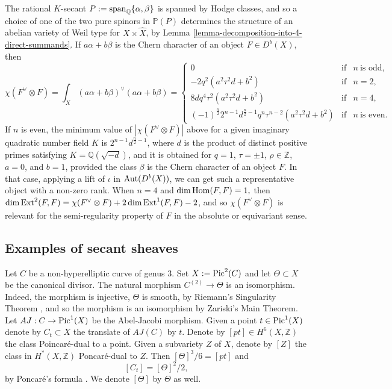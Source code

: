 \documentclass[12pt]{amsart}
\numberwithin{equation}{subsection}
\theoremstyle{plain}
\theoremstyle{definition}
\newcommand{\QQ}{{\mathbb Q}}
\newcommand{\ZZ}{{\mathbb Z}}
\newcommand{\PP}{{\mathbb P}}
\newcommand{\Pic}{{\rm Pic}}
\newcommand{\Ext}{{\rm Ext}}
\newcommand{\Hom}{{\rm Hom}}
\newcommand{\Aut}{{\rm Aut}}
\renewcommand{\span}{{\rm span}}
\begin{document}
The rational $K$-secant $P:=\span_\QQ\{\alpha,\beta\}$ is spanned by Hodge classes, and so a choice of one of the two pure spinors in $\PP(P)$ determines 
the structure of an abelian variety of Weil type for $X\times\hat{X}$, by Lemma \ref{lemma-decomposition-into-4-direct-summands}. If $a\alpha+b\beta$ is the Chern character of an object $F\in D^b(X)$, then
\[
\chi(F^\vee\otimes F)=\int_X(a\alpha+b\beta)^\vee(a\alpha+b\beta)=\left\{
\begin{array}{ccl}
0 & \mbox{if} & n \ \mbox{is odd},
\\
 -2q^2(a^2\tau^2d+b^2) & \mbox{if} & n=2,
 \\
 8dq^4\tau^2(a^2\tau^2d+b^2) & \mbox{if} & n=4,
 \\
(-1)^{\frac{n}{2}}2^{n-1}d^{\frac{n}{2}-1}q^n\tau^{n-2}(a^2\tau^2d+b^2)
& \mbox{if} & n \ \mbox{is even.}
\end{array}
\right.
\]
If $n$ is even, the minimum value of $|\chi(F^\vee\otimes F)|$ above for a given imaginary quadratic number field $K$ 
is $2^{n-1}d^{\frac{n}{2}-1}$, where $d$ is the product of distinct positive primes satisfying $K=\QQ(\sqrt{-d})$, and it is obtained for $q=1$, $\tau=\pm 1$, $\rho\in \ZZ$, $a=0$, and $b=1$, provided the class $\beta$ is the Chern character of an object $F$. In that case, applying a lift of $\iota$ in $\Aut(D^b(X))$, we can get such a representative object with a non-zero rank. When $n=4$ and $\dim\Hom(F,F)=1,$
then $\dim\Ext^2(F,F)=\chi(F^\vee\otimes F)+2\dim\Ext^1(F,F)-2$, and so $\chi(F^\vee\otimes F)$ is relevant for the semi-regularity property of $F$ in the absolute or equivariant sense. 
% 
\subsection{Examples of secant sheaves}
\label{sec-examples-of-secant-sheaves}

Let $C$ be a non-hyperelliptic curve of genus $3$. 
Set $X:=\Pic^2(C)$ and let $\Theta\subset X$ be the canonical divisor. The natural morphism $C^{(2)}\rightarrow \Theta$ is an isomorphism. Indeed, the morphism is injective, $\Theta$ is smooth, by Riemann's Singularity Theorem \cite[Theorem 11.2.5]{BL}, and so the morphism is an isomorphism by Zariski's Main Theorem. 
Let $AJ:C\rightarrow \Pic^1(X)$ be the Abel-Jacobi morphism.
Given a point $t\in \Pic^1(X)$ denote by $C_t\subset X$ the translate of $AJ(C)$ by $t$. Denote by $[pt]\in H^6(X,\ZZ)$ the class Poincar\'{e}-dual to a point. 
Given a subvariety $Z$ of $X$, denote by $[Z]$ the class in $H^*(X,\ZZ)$ Poncar\'{e}-dual to $Z$.
Then $[\Theta]^3/6=[pt]$ and 
\[
[C_t]=[\Theta]^2/2,
\]
by Poncar\'{e}'s formula \cite[Sec. 11.2]{BL}. We denote $[\Theta]$ by $\Theta$ as well.
\end{document}
